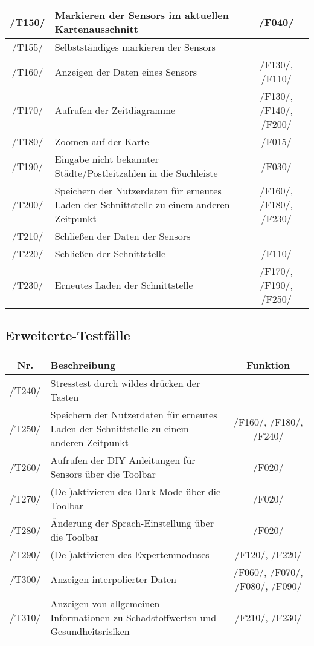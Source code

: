\begin{tabularx}{\textwidth}{| c | X | c |}
     \hline
     /T150/ & Markieren der \glspl{Sensor} im aktuellen Kartenausschnitt & /F040/ \\
     \hline 
     /T155/ & Selbstständiges markieren der \glspl{Sensor} & \\
     \hline
     /T160/ & Anzeigen der Daten eines Sensors &  /F130/, /F110/ \\
     \hline
     /T170/ & Aufrufen der Zeitdiagramme & /F130/, /F140/, /F200/ \\
     \hline
     /T180/ & Zoomen auf der Karte & /F015/ \\
     \hline
     /T190/ & Eingabe nicht bekannter Städte/Postleitzahlen in die Suchleiste & /F030/ \\
     \hline
     /T200/ & Speichern der Nutzerdaten für erneutes Laden der Schnittstelle zu einem anderen Zeitpunkt & /F160/, /F180/, /F230/ \\
     \hline
     /T210/ & Schließen der Daten der \glspl{Sensor} & \\
     \hline
     /T220/ & Schließen der Schnittstelle & /F110/ \\
     \hline
     /T230/ & Erneutes Laden der Schnittstelle & /F170/, /F190/, /F250/ \\
     \hline
    \end{tabularx}

\subsection{Erweiterte-Testfälle}
\begin{tabularx}{\textwidth}{| c | X | c |}
    \hline
    \textbf{Nr.} & 
    \textbf{Beschreibung} &
    \textbf{Funktion}\\
    \hline 
    /T240/ & Stresstest durch wildes drücken der Tasten & \\
    \hline      
    /T250/ & Speichern der Nutzerdaten für erneutes Laden der Schnittstelle zu einem anderen Zeitpunkt & /F160/, /F180/, /F240/ \\
    \hline  
    /T260/ & Aufrufen der \gls{DIY} Anleitungen für \glspl{Sensor} über die \gls{Toolbar} & /F020/ \\
    \hline
    /T270/ & (De-)aktivieren des Dark-Mode über die \gls{Toolbar} & /F020/ \\
    \hline
    /T280/ & Änderung der Sprach-Einstellung über die \gls{Toolbar} & /F020/ \\
    \hline
    /T290/ & (De-)aktivieren des Expertenmoduses & /F120/, /F220/ \\
    \hline
    /T300/ & Anzeigen interpolierter Daten & /F060/, /F070/, /F080/, /F090/ \\
    \hline
    /T310/ & Anzeigen von allgemeinen Informationen zu \glspl{Schadstoffwert}n und Gesundheitsrisiken & /F210/, /F230/ \\
    \hline
\end{tabularx}


